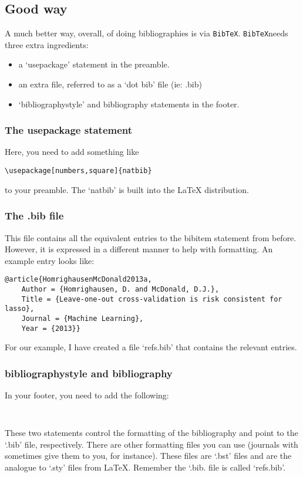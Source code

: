 \documentclass{article}
\newcommand{\B}{{\tt BibTeX}}
\begin{document}
\subsection{Good way}
A much better way, overall, of doing bibliographies is via \B.  \B needs three extra ingredients: 
\begin{itemize}
\item a `usepackage' statement in the preamble.  
\item an extra file, referred to as a `dot bib' file (ie: .bib)
\item `bibliographystyle' and bibliography statements in the footer.
\end{itemize}

\subsubsection{The usepackage statement}
Here, you need to add something like
\begin{verbatim}
\usepackage[numbers,square]{natbib}
\end{verbatim}
to your preamble.  The `natbib' is built into the \LaTeX{} distribution.  

\subsubsection{The .bib file}
This file contains all the equivalent entries to the bibitem statement from before.  
However, it is expressed in a different manner to help with formatting.  An example entry looks like:
\begin{verbatim}
@article{HomrighausenMcDonald2013a,
	Author = {Homrighausen, D. and McDonald, D.J.},
	Title = {Leave-one-out cross-validation is risk consistent for lasso},
	Journal = {Machine Learning},
	Year = {2013}}
\end{verbatim}

For our example, I have created a file `refs.bib' that contains the relevant entries.

\subsubsection{bibliographystyle and bibliography}
In your footer, you need to add the following:
\begin{verbatim}


\end{verbatim}

These two statements control the formatting of the bibliography and point to the `.bib' file, respectively. 
There are other formatting files you can use (journals
with sometimes give them to you, for instance).  These files are `.bst' files and are the analogue to `.sty' files from \LaTeX{}.
Remember the `.bib. file is called `refs.bib'.
\end{document}
